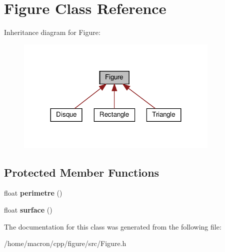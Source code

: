 \hypertarget{classFigure}{}\section{Figure Class Reference}
\label{classFigure}


Inheritance diagram for Figure\+:
\nopagebreak
\begin{figure}[H]
\begin{center}
\leavevmode
\includegraphics[width=275pt]{classFigure__inherit__graph}
\end{center}
\end{figure}
\subsection*{Protected Member Functions}
\begin{DoxyCompactItemize}
\item 
\mbox{\label{classFigure_a82a6ec992970471c1e7ae9b7a66d9008}} 
float {\bfseries perimetre} ()
\item 
\mbox{\label{classFigure_a4b0cc8fdc08b636ffbe71342dbd11af4}} 
float {\bfseries surface} ()
\end{DoxyCompactItemize}


The documentation for this class was generated from the following file\+:\begin{DoxyCompactItemize}
\item 
/home/macron/cpp/figure/src/Figure.\+h\end{DoxyCompactItemize}
